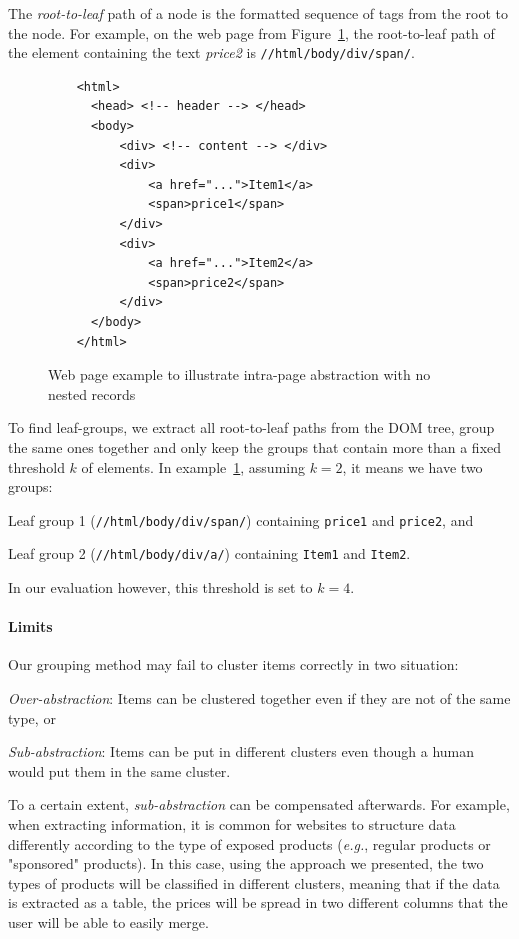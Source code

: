 The \emph{root-to-leaf} path of a node is the formatted sequence of tags from the root to the node.
For example, on the web page from Figure~\ref{fig:non_recursive_html}, the root-to-leaf path of the element containing the text \emph{price2} is \lstinline{//html/body/div/span/}.

\begin{figure}[ht]
  \centering
  \begin{lstlisting}
    <html>
      <head> <!-- header --> </head>
      <body>
          <div> <!-- content --> </div>
          <div>
              <a href="...">Item1</a>
              <span>price1</span>
          </div>
          <div>
              <a href="...">Item2</a>
              <span>price2</span>
          </div>
      </body>
    </html>
  \end{lstlisting}
  \caption{Web page example to illustrate intra-page abstraction with no nested records}
  \label{fig:non_recursive_html}
\end{figure}

To find leaf-groups, we extract all root-to-leaf paths from the DOM tree, group the same ones together
and only keep the groups that contain more than a fixed threshold $k$ of elements.
In example~\ref{fig:non_recursive_html}, assuming $k=2$, it means we have two groups:
\begin{compactenum}
  \item Leaf group 1 (\texttt{//html/body/div/span/}) containing \texttt{price1} and \texttt{price2}, and
  \item Leaf group 2 (\texttt{//html/body/div/a/}) containing \texttt{Item1} and \texttt{Item2}.
\end{compactenum}
In our evaluation however, this threshold is set to $k=4$.

\paragraph{Limits}
Our grouping method may fail to cluster items correctly in two situation:
\begin{compactitem}
  \item \emph{Over-abstraction}: Items can be clustered together even if they are not of the same type, or
  \item \emph{Sub-abstraction}: Items can be put in different clusters even though a human would put them in the same cluster.
\end{compactitem}
To a certain extent, \emph{sub-abstraction} can be compensated afterwards.
For example, when extracting information, it is common for websites to structure data differently according to the type of exposed products (\emph{e.g.}, regular products or "sponsored" products). 
In this case, using the approach we presented, the two types of products will be classified in different clusters, meaning that if the data is extracted as a table, the prices will be spread in two different columns that the user will be able to easily merge.

